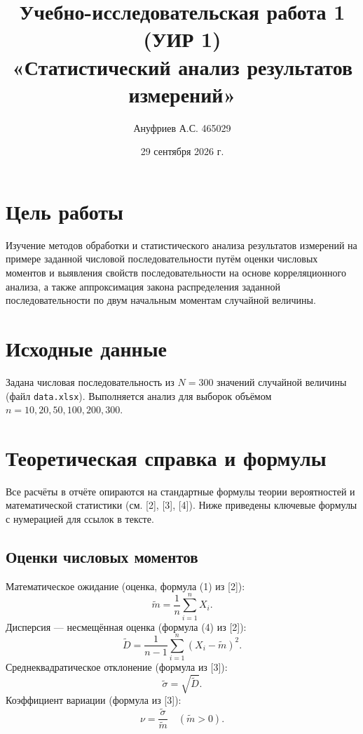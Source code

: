 \documentclass[a4paper,12pt]{article}
\title{Учебно-исследовательская работа 1 (УИР 1)\\\large «Статистический анализ результатов измерений»}
\author{Ануфриев А.С. 465029}
\date{29 сентября 2026 г.}
\begin{document}
\maketitle
\thispagestyle{empty}

\tableofcontents
\newpage

\section{Цель работы}
Изучение методов обработки и статистического анализа результатов измерений на примере заданной числовой последовательности путём оценки числовых моментов и выявления свойств последовательности на основе корреляционного анализа, а также аппроксимация закона распределения заданной последовательности по двум начальным моментам случайной величины.

\section{Исходные данные}
Задана числовая последовательность из $N=300$ значений случайной величины (файл \texttt{data.xlsx}).
Выполняется анализ для выборок объёмом $n = 10, 20, 50, 100, 200, 300$.
\section{Теоретическая справка и формулы}

Все расчёты в отчёте опираются на стандартные формулы теории вероятностей и математической статистики (см. [2], [3], [4]). Ниже приведены ключевые формулы с нумерацией для ссылок в тексте.

\subsection{Оценки числовых моментов}
Математическое ожидание (оценка, формула (1) из [2]):
\begin{equation}\label{eq:ref_m}
\tilde{m} = \frac{1}{n}\sum_{i=1}^{n} X_i.
\end{equation}
Дисперсия — несмещённая оценка (формула (4) из [2]):
\begin{equation}\label{eq:ref_D}
\tilde{D} = \frac{1}{n-1}\sum_{i=1}^{n}(X_i - \tilde{m})^2.
\end{equation}
Среднеквадратическое отклонение (формула из [3]):
\begin{equation}\label{eq:ref_sigma}
\tilde{\sigma} = \sqrt{\tilde{D}}.
\end{equation}
Коэффициент вариации (формула из [3]):
\begin{equation}\label{eq:ref_nu}
\nu = \frac{\tilde{\sigma}}{\tilde{m}} \quad (\tilde{m}>0).
\end{equation}
\end{document}
